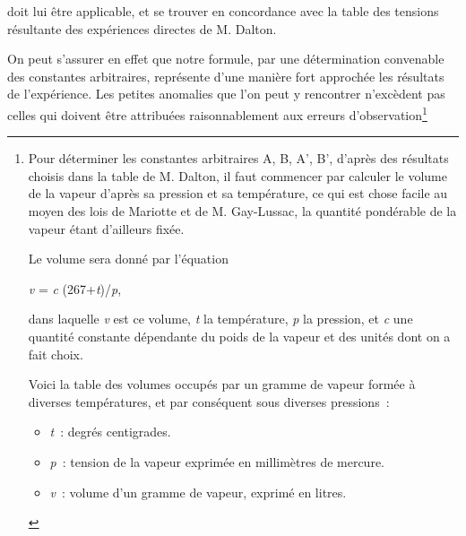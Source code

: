 \documentclass[french,twoside]{book} %
\begin{document}
\noindent doit lui être applicable, et se trouver en concordance avec la table des tensions résultante des expériences directes de M. Dalton.\par
On peut s’assurer en effet que notre formule, par une détermination convenable des constantes arbitraires, représente d’une manière fort approchée les résultats de l’expérience. Les petites anomalies que l’on peut y rencontrer n’excèdent pas celles qui doivent être attribuées raisonnablement aux erreurs d’observation\footnote{ \noindent Pour déterminer les constantes arbitraires A, B, A’, B’, d’après des résultats choisis dans la table de M. Dalton, il faut commencer par calculer le volume de la vapeur d’après sa pression et sa température, ce qui est chose facile au moyen des lois de Mariotte et de M. Gay-Lussac, la quantité pondérable de la vapeur étant d’ailleurs fixée.\par
 Le volume sera donné par l’équation\par
 
\begin{center}
\noindent \emph{v} = \emph{c} (267+\emph{t})/\emph{p},\par
\end{center}

 \noindent dans laquelle \emph{v} est ce volume, \emph{t} la température, \emph{p} la pression, et \emph{c} une quantité constante dépendante du poids de la vapeur et des unités dont on a fait choix.\par
 Voici la table des volumes occupés par un gramme de vapeur formée à diverses températures, et par conséquent sous diverses pressions :\par
 
\begin{itemize}[itemsep=0pt,topsep=0pt,partopsep=0pt,parskip=0pt]
\item \emph{t} : degrés centigrades. 
\item \emph{p} : tension de la vapeur exprimée en millimètres de mercure.
\item \emph{v} : volume d’un gramme de vapeur, exprimé en litres.
\end{itemize}

}
\end{document}
